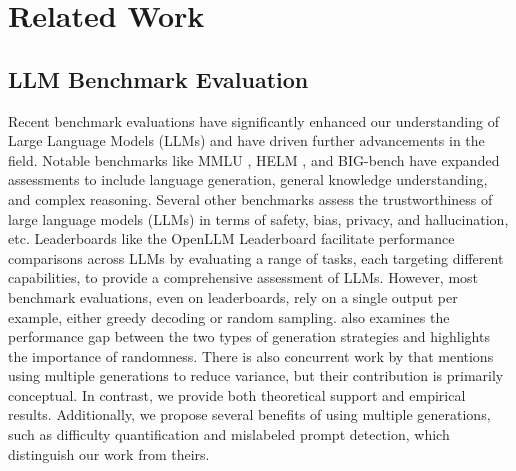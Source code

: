 \section{Related Work}
\subsection{LLM Benchmark Evaluation}
Recent benchmark evaluations have significantly enhanced our understanding of Large Language Models (LLMs) and have driven further advancements in the field. Notable benchmarks like MMLU \citep{hendrycks2020measuring}, HELM \citep{liang2022holistic}, and BIG-bench \citep{srivastava2022beyond} have expanded assessments to include language generation, general knowledge understanding, and complex reasoning. Several other benchmarks assess the trustworthiness of large language models (LLMs) \citep{wang2023decodingtrust, huang2024trustllm, zhang2024defining} in terms of safety, bias, privacy, and hallucination, etc. Leaderboards like the OpenLLM Leaderboard \citep{open-llm-leaderboard-v1} facilitate performance comparisons across LLMs by evaluating a range of tasks, each targeting different capabilities, to provide a comprehensive assessment of LLMs. However, most benchmark evaluations, even on leaderboards, rely on a single output per example, either greedy decoding or random sampling. \citet{song2024good} also examines the performance gap between the two types of generation strategies and highlights the importance of randomness. There is also concurrent work by \citet{miller2024adding} that mentions using multiple generations to reduce variance, but their contribution is primarily conceptual. In contrast, we provide both theoretical support and empirical results. Additionally, we propose several benefits of using multiple generations, such as difficulty quantification and mislabeled prompt detection, which distinguish our work from theirs.

